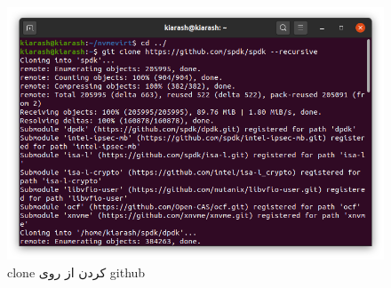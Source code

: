 \begin{figure}[H]
    \centering
    \includegraphics[width=\textwidth]{figs/gitclone.png}
    \caption{clone کردن از روی github}
\end{figure}

